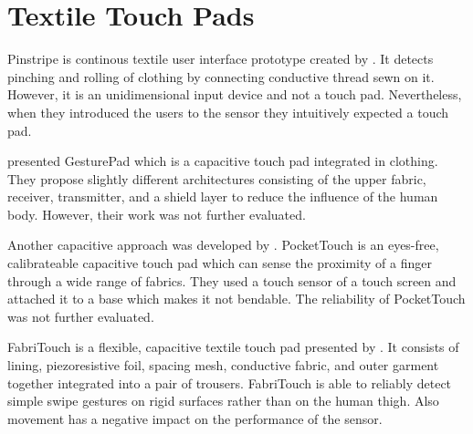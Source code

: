 \section{Textile Touch Pads}
Pinstripe is continous textile user interface prototype created by \cite{Karrer:2010:PEC:1866218.1866255}. It detects pinching and rolling of clothing by connecting conductive thread sewn on it. However, it is an unidimensional input device and not a touch pad. Nevertheless, when they introduced the users to the sensor they intuitively expected a touch pad. 

\cite{Rekimoto:2001:962092} presented GesturePad which is a capacitive touch pad integrated in clothing. They propose slightly different architectures consisting of the upper fabric, receiver, transmitter, and a shield layer to reduce the influence of the human body. However, their work was not further evaluated. 

Another capacitive approach was developed by \cite{Saponas:2011:PTC:2047196.2047235}. PocketTouch is an eyes-free, calibrateable capacitive touch pad which can sense the proximity of a finger through a wide range of fabrics. They used a touch sensor of a touch screen and attached it to a base which makes it not bendable. The reliability of PocketTouch was not further evaluated. 

FabriTouch is a flexible, capacitive textile touch pad presented by \cite{Heller:2014:FEF:2634317.2634345}. It consists of lining, piezoresistive foil, spacing mesh, conductive fabric, and outer garment together integrated into a pair of trousers. FabriTouch is able to reliably detect simple swipe gestures on rigid surfaces rather than on the human thigh. Also movement has a negative impact on the performance of the sensor.